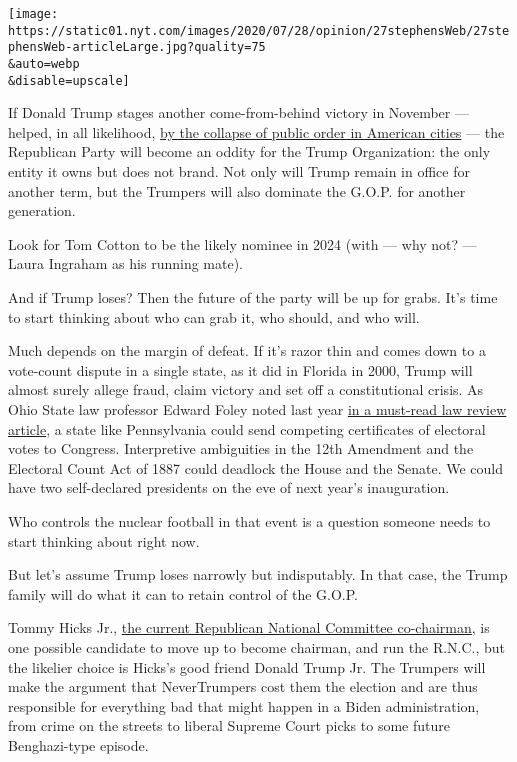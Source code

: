 \texttt{[image: https://static01.nyt.com/images/2020/07/28/opinion/27stephensWeb/27stephensWeb-articleLarge.jpg?quality=75\\\&auto=webp\\\&disable=upscale]}

If Donald Trump stages another come-from-behind victory in November ---
helped, in all likelihood,
\href{https://www.nytimes.com/2020/07/26/us/protests-portland-seattle-trump.html?action=click\&module=Top\%20Stories\&pgtype=Homepage}{by
the collapse of public order in American cities} --- the Republican
Party will become an oddity for the Trump Organization: the only entity
it owns but does not brand. Not only will Trump remain in office for
another term, but the Trumpers will also dominate the G.O.P. for another
generation.

Look for Tom Cotton to be the likely nominee in 2024 (with --- why not?
--- Laura Ingraham as his running mate).

And if Trump loses? Then the future of the party will be up for grabs.
It's time to start thinking about who can grab it, who should, and who
will.

Much depends on the margin of defeat. If it's razor thin and comes down
to a vote-count dispute in a single state, as it did in Florida in 2000,
Trump will almost surely allege fraud, claim victory and set off a
constitutional crisis. As Ohio State law professor Edward Foley noted
last year
\href{https://lawecommons.luc.edu/cgi/viewcontent.cgi?article=2719\&context=luclj}{in
a must-read law review article}, a state like Pennsylvania could send
competing certificates of electoral votes to Congress. Interpretive
ambiguities in the 12th Amendment and the Electoral Count Act of 1887
could deadlock the House and the Senate. We could have two self-declared
presidents on the eve of next year's inauguration.

Who controls the nuclear football in that event is a question someone
needs to start thinking about right now.

But let's assume Trump loses narrowly but indisputably. In that case,
the Trump family will do what it can to retain control of the G.O.P.

Tommy Hicks Jr.,
\href{https://www.buzzfeednews.com/article/tariniparti/trump-tommy-hicks-rnc-co-chair}{the
current Republican National Committee co-chairman}, is one possible
candidate to move up to become chairman, and run the R.N.C., but the
likelier choice is Hicks's good friend Donald Trump Jr. The Trumpers
will make the argument that NeverTrumpers cost them the election and are
thus responsible for everything bad that might happen in a Biden
administration, from crime on the streets to liberal Supreme Court picks
to some future Benghazi-type episode.

